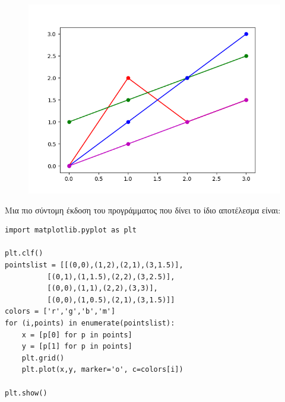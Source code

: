 \begin{figure}
\includegraphics{4plots.png}
\end{figure}

Μια πιο σύντομη έκδοση του προγράμματος που δίνει το ίδιο αποτέλεσμα είναι:
\begin{lstlisting}
import matplotlib.pyplot as plt

plt.clf()
pointslist = [[(0,0),(1,2),(2,1),(3,1.5)],
          [(0,1),(1,1.5),(2,2),(3,2.5)],
          [(0,0),(1,1),(2,2),(3,3)],
          [(0,0),(1,0.5),(2,1),(3,1.5)]]
colors = ['r','g','b','m']
for (i,points) in enumerate(pointslist):
    x = [p[0] for p in points]
    y = [p[1] for p in points]
    plt.grid()
    plt.plot(x,y, marker='o', c=colors[i])

plt.show()
\end{lstlisting}

